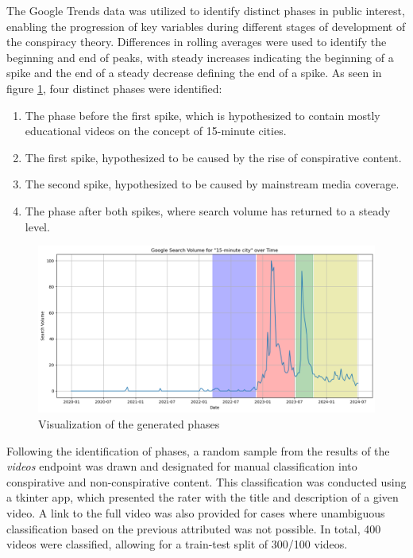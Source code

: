 \documentclass[fontsize=11pt, parskip=half]{scrartcl}
\begin{document}
    The Google Trends data  was utilized to identify distinct phases in public interest, enabling the progression of key variables during different stages of development of the conspiracy theory. Differences in rolling averages were used to identify the beginning and end of peaks, with steady increases indicating the beginning of a spike and the end of a steady decrease defining the end of a spike. As seen in figure \ref{fig:gtrends_phases}, four distinct phases were identified: 
    \begin{enumerate}
        \item The phase before the first spike, which is hypothesized to contain mostly educational videos on the concept of 15-minute cities.
        \item The first spike, hypothesized to be caused by the rise of conspirative content.
        \item The second spike, hypothesized to be caused by mainstream media coverage.
        \item The phase after both spikes, where search volume has returned to a steady level.
    \end{enumerate}

    \begin{figure}{}
        \centering
        \setlength\intextsep{0pt}
        \includegraphics[width=0.8 \textwidth]{img/gtrends_phases.png}
        \vspace{-5pt}
        \caption{Visualization of the generated phases}
        \vspace{-10pt}
        \label{fig:gtrends_phases}
    \end{figure}

    Following the identification of phases, a random sample from the results of the \textit{videos} endpoint was drawn and designated for manual classification into conspirative and non-conspirative content. This classification was conducted using a tkinter app, which presented the rater with the title and description of a given video. A link to the full video was also provided for cases where unambiguous classification based on the previous attributed was not possible. In total, 400 videos were classified, allowing for a train-test split of 300/100 videos.
\end{document}
